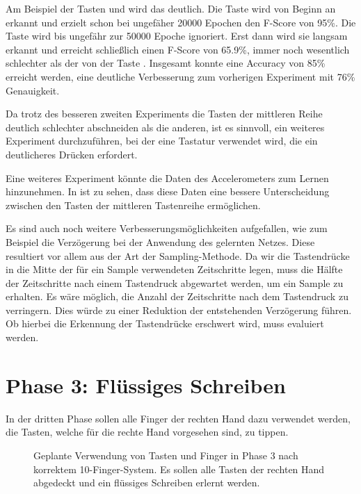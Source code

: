 Am Beispiel der Tasten  und  wird das deutlich. Die Taste  wird von Beginn an erkannt und erzielt schon bei ungefäher \num{20000} Epochen den F-Score von 95\%. Die Taste  wird bis ungefähr zur \num{50000} Epoche ignoriert. Erst dann wird sie langsam erkannt und erreicht schließlich einen F-Score von 65.9\%, immer noch wesentlich schlechter als der von der Taste .
Insgesamt konnte eine Accuracy von 85\% erreicht werden, eine deutliche Verbesserung zum vorherigen Experiment mit 76\% Genauigkeit.

Da trotz des besseren zweiten Experiments die Tasten der mittleren Reihe deutlich schlechter abschneiden als die anderen, ist es sinnvoll, ein weiteres Experiment durchzuführen, bei der eine Tastatur verwendet wird, die ein deutlicheres Drücken erfordert.

Eine weiteres Experiment könnte die Daten des Accelerometers zum Lernen hinzunehmen. In  ist zu sehen, dass diese Daten eine bessere Unterscheidung zwischen den Tasten der mittleren Tastenreihe ermöglichen.

Es sind auch noch weitere Verbesserungsmöglichkeiten aufgefallen, wie zum Beispiel die Verzögerung bei der Anwendung des gelernten Netzes.
Diese resultiert vor allem aus der Art der Sampling-Methode. Da wir die Tastendrücke in die Mitte der für ein Sample verwendeten Zeitschritte legen, muss die Hälfte der Zeitschritte nach einem Tastendruck abgewartet werden, um ein Sample zu erhalten. Es wäre möglich, die Anzahl der Zeitschritte nach dem Tastendruck zu verringern. Dies würde zu einer Reduktion der entstehenden Verzögerung führen. Ob hierbei die Erkennung der Tastendrücke erschwert wird, muss evaluiert werden.

\section{Phase 3: Flüssiges Schreiben}

In der dritten Phase sollen alle Finger der rechten Hand dazu verwendet werden, die Tasten, welche für die rechte Hand vorgesehen sind, zu tippen.

\begin{figure}[h]
    \centering
    \caption[Tasten und Finger in Phase 3]{Geplante Verwendung von Tasten und Finger in Phase 3 nach korrektem 10-Finger-System. Es sollen alle Tasten der rechten Hand abgedeckt und ein flüssiges Schreiben erlernt werden.}
\end{figure}

